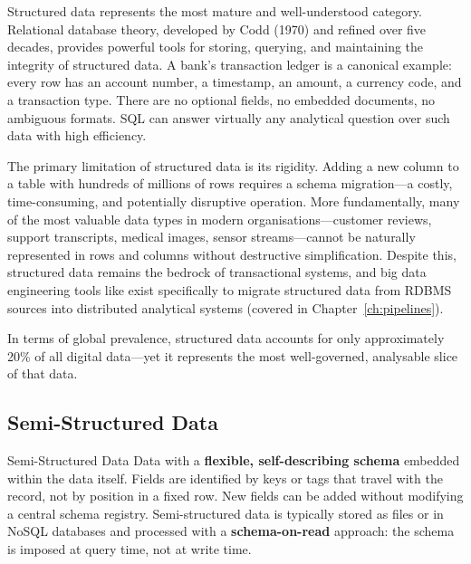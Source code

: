 Structured data represents the most mature and well-understood category.
Relational database theory, developed by Codd (1970) and refined over
five decades, provides powerful tools for storing, querying, and
maintaining the integrity of structured data. A bank's transaction ledger
is a canonical example: every row has an account number, a timestamp, an
amount, a currency code, and a transaction type. There are no optional
fields, no embedded documents, no ambiguous formats. SQL can answer
virtually any analytical question over such data with high efficiency.

The primary limitation of structured data is its rigidity. Adding a new
column to a table with hundreds of millions of rows requires a schema
migration---a costly, time-consuming, and potentially disruptive
operation. More fundamentally, many of the most valuable data types in
modern organisations---customer reviews, support transcripts, medical
images, sensor streams---cannot be naturally represented in rows and
columns without destructive simplification. Despite this, structured data
remains the bedrock of transactional systems, and big data engineering
tools like  exist specifically to migrate structured
data from RDBMS sources into distributed analytical systems (covered in
Chapter~\ref{ch:pipelines}).

In terms of global prevalence, structured data accounts for only
approximately 20\% of all digital data---yet it represents the most
well-governed, analysable slice of that data.

\subsection{Semi-Structured Data}
\label{subsec:semi-structured}

\begin{defbox}{Semi-Structured Data}
Data with a \textbf{flexible, self-describing schema} embedded within
the data itself. Fields are identified by keys or tags that travel with
the record, not by position in a fixed row. New fields can be added
without modifying a central schema registry. Semi-structured data is
typically stored as files or in NoSQL databases and processed with a
\textbf{schema-on-read} approach: the schema is imposed at query time,
not at write time.
\end{defbox}

